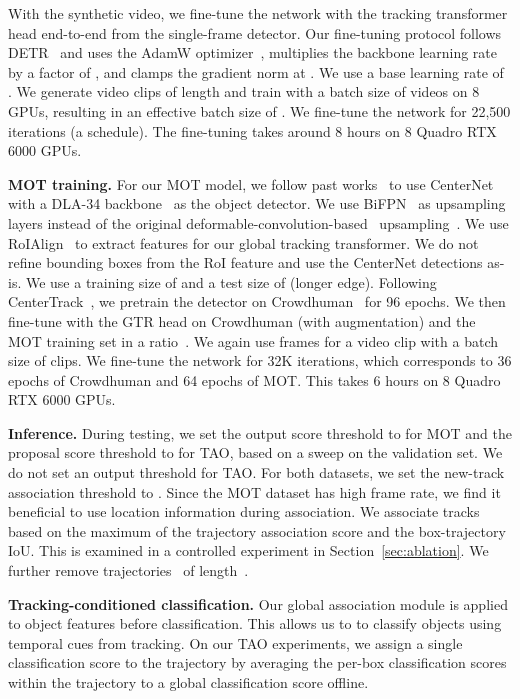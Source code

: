 \documentclass[10pt,twocolumn,letterpaper]{article}
\newcommand{\refsec}[1]{Section~\ref{sec:#1}}
\begin{document}
With the synthetic video, we fine-tune the network with the tracking transformer head end-to-end from the single-frame detector.
Our fine-tuning protocol follows DETR~\cite{carion2020end} and uses the AdamW optimizer~\cite{loshchilov2017decoupled}, multiplies the backbone learning rate by a factor of , and clamps the gradient norm at .
We use a base learning rate of .
We generate video clips of length  and train with a batch size of  videos on 8 GPUs, resulting in an effective batch size of .
We fine-tune the network for 22,500 iterations (a  schedule).
The fine-tuning takes around 8 hours on 8 Quadro RTX 6000 GPUs.


\par \noindent \textbf{MOT training.}
For our MOT model, we follow past works~\cite{zhou2020tracking,zhang2020fair} to use CenterNet~\cite{zhou2019objects} with a DLA-34 backbone~\cite{yu2018deep} as the object detector.
We use BiFPN~\cite{tan2020efficientdet} as upsampling layers instead of the original deformable-convolution-based~\cite{dai2017deformable} upsampling~\cite{yu2018deep}.
We use RoIAlign~\cite{he2017mask} to extract features for our global tracking transformer.
We do not refine bounding boxes from the RoI feature and use the CenterNet detections as-is.
We use a training size of  and a test size of  (longer edge).
Following CenterTrack~\cite{zhou2020tracking}, we pretrain the detector on Crowdhuman~\cite{shao2018crowdhuman} for 96 epochs.
We then fine-tune with the GTR head on Crowdhuman (with augmentation) and the MOT training set in a  ratio~\cite{transtrack}.
We again use  frames for a video clip with a batch size of  clips.
We fine-tune the network for 32K iterations, which corresponds to 36 epochs of Crowdhuman and 64 epochs of MOT.
This takes 6 hours on 8 Quadro RTX 6000 GPUs.

\par \noindent \textbf{Inference.}
During testing, we set the output score threshold to  for MOT and the proposal score threshold to  for TAO, based on a sweep on the validation set.
We do not set an output threshold for TAO.
For both datasets, we set the new-track association threshold to .
Since the MOT dataset has high frame rate, we find it beneficial to use location information during association.
We associate tracks based on the maximum of the trajectory association score and the box-trajectory IoU.
This is examined in a controlled experiment in \refsec{ablation}.
We further remove trajectories~\cite{braso2020learning} of length~.

\par \noindent \textbf{Tracking-conditioned classification.}
Our global association module is applied to object features before classification.
This allows us to to classify objects using temporal cues from tracking.
On our TAO experiments, we assign a single classification score to the trajectory by averaging 
the per-box classification scores within the trajectory to a global classification score offline.
\end{document}
